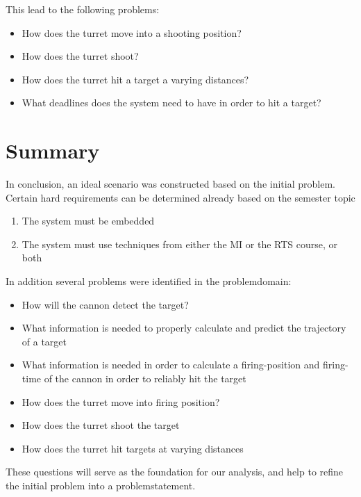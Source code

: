 This lead to the following problems:
\begin{itemize}
  \item How does the turret move into a shooting position?
  \item How does the turret shoot?
  \item How does the turret hit a target a varying distances?
  \item What deadlines does the system need to have in order to hit a target?
\end{itemize}

\section{Summary}
In conclusion, an ideal scenario was constructed based on the initial problem.
Certain hard requirements can be determined already based on the semester topic
\begin{enumerate}
	\item The system must be embedded
	\item The system must use techniques from either the MI or the RTS course, or both
\end{enumerate}


In addition several problems were identified in the problemdomain:
\begin{itemize}
	\item How will the cannon detect the target?
	\item What information is needed to properly calculate and predict the trajectory of a target
	\item What information is needed in order to calculate a firing-position and firing-time of the cannon in order to reliably hit the target
	\item How does the turret move into firing position?
	\item How does the turret shoot the target
	\item How does the turret hit targets at varying distances
\end{itemize}
These questions will serve as the foundation for our analysis, and help to refine the initial problem into a problemstatement.

